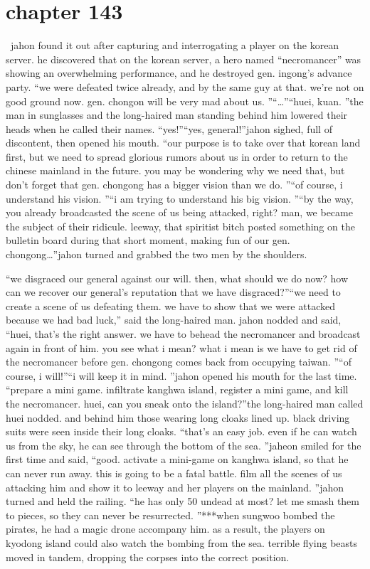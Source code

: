 \section{chapter 143}






 jahon found it out after capturing and interrogating a player on the korean server.
he discovered that on the korean server, a hero named “necromancer” was showing an overwhelming performance, and he destroyed gen.
 ingong’s advance party.
“we were defeated twice already, and by the same guy at that.
 we’re not on good ground now.
 gen.
 chongon will be very mad about us.
”“…”“huei, kuan.
”the man in sunglasses and the long-haired man standing behind him lowered their heads when he called their names.
“yes!”“yes, general!”jahon sighed, full of discontent, then opened his mouth.
“our purpose is to take over that korean land first, but we need to spread glorious rumors about us in order to return to the chinese mainland in the future.
 you may be wondering why we need that, but don’t forget that gen.
 chongong has a bigger vision than we do.
”“of course, i understand his vision.
”“i am trying to understand his big vision.
”“by the way, you already broadcasted the scene of us being attacked, right? man, we became the subject of their ridicule.
 leeway, that spiritist bitch posted something on the bulletin board during that short moment, making fun of our gen.
 chongong…”jahon turned and grabbed the two men by the shoulders.

“we disgraced our general against our will.
 then, what should we do now? how can we recover our general’s reputation that we have disgraced?”“we need to create a scene of us defeating them.
 we have to show that we were attacked because we had bad luck,” said the long-haired man.
jahon nodded and said, “huei, that’s the right answer.
 we have to behead the necromancer and broadcast again in front of him.
 you see what i mean? what i mean is we have to get rid of the necromancer before gen.
 chongong comes back from occupying taiwan.
”“of course, i will!”“i will keep it in mind.
”jahon opened his mouth for the last time.
“prepare a mini game.
 infiltrate kanghwa island, register a mini game, and kill the necromancer.
 huei, can you sneak onto the island?”the long-haired man called huei nodded.
 and behind him those wearing long cloaks lined up.
 black driving suits were seen inside their long cloaks.
“that’s an easy job.
 even if he can watch us from the sky, he can see through the bottom of the sea.
”jaheon smiled for the first time and said, “good.
 activate a mini-game on kanghwa island, so that he can never run away.
 this is going to be a fatal battle.
 film all the scenes of us attacking him and show it to leeway and her players on the mainland.
”jahon turned and held the railing.
“he has only 50 undead at most? let me smash them to pieces, so they can never be resurrected.
”***when sungwoo bombed the pirates, he had a magic drone accompany him.
 as a result, the players on kyodong island could also watch the bombing from the sea.
terrible flying beasts moved in tandem, dropping the corpses into the correct position.

